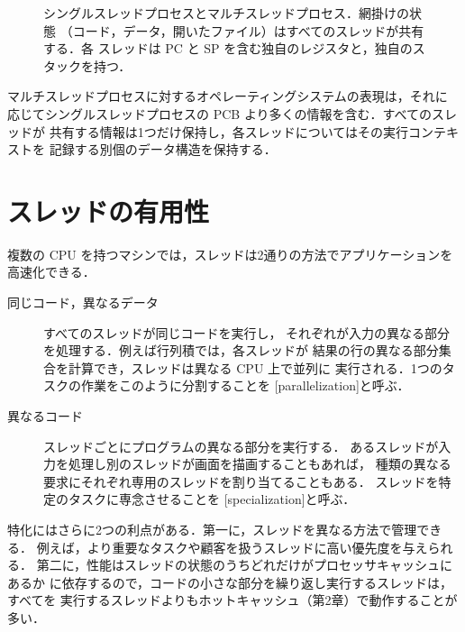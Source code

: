\documentclass[../main.tex]{subfiles}
\begin{document}
\begin{figure}[htbp]
  \centering
  
  \caption{シングルスレッドプロセスとマルチスレッドプロセス．網掛けの状態
    （コード，データ，開いたファイル）はすべてのスレッドが共有する．各
    スレッドは PC と SP を含む独自のレジスタと，独自のスタックを持つ．}
  \label{fig:l03-process-thread}
\end{figure}

マルチスレッドプロセスに対するオペレーティングシステムの表現は，それに
応じてシングルスレッドプロセスの PCB より多くの情報を含む．すべてのスレッドが
共有する情報は1つだけ保持し，各スレッドについてはその実行コンテキストを
記録する別個のデータ構造を保持する．

\section{スレッドの有用性}
\label{sec:l03-benefits}

複数の CPU を持つマシンでは，スレッドは2通りの方法でアプリケーションを
高速化できる．

\begin{description}
  \item[同じコード，異なるデータ] すべてのスレッドが同じコードを実行し，
    それぞれが入力の異なる部分を処理する．例えば行列積では，各スレッドが
    結果の行の異なる部分集合を計算でき，スレッドは異なる CPU 上で並列に
    実行される．1つのタスクの作業をこのように分割することを
    [parallelization]と呼ぶ．
  \item[異なるコード] スレッドごとにプログラムの異なる部分を実行する．
    あるスレッドが入力を処理し別のスレッドが画面を描画することもあれば，
    種類の異なる要求にそれぞれ専用のスレッドを割り当てることもある．
    スレッドを特定のタスクに専念させることを
    [specialization]と呼ぶ．
\end{description}

特化にはさらに2つの利点がある．第一に，スレッドを異なる方法で管理できる．
例えば，より重要なタスクや顧客を扱うスレッドに高い優先度を与えられる．
第二に，性能はスレッドの状態のうちどれだけがプロセッサキャッシュにあるか
に依存するので，コードの小さな部分を繰り返し実行するスレッドは，すべてを
実行するスレッドよりもホットキャッシュ（第2章）で動作することが多い．
\end{document}
